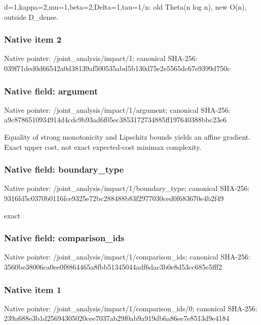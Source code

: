 \documentclass[10pt,a4paper]{article}
\begin{document}
\begingroup\raggedright\sloppy d=\allowbreak{}1,\allowbreak{}kappa=\allowbreak{}2,\allowbreak{}mu=\allowbreak{}1,\allowbreak{}beta=\allowbreak{}2,\allowbreak{}Delta=\allowbreak{}1,\allowbreak{}tau=\allowbreak{}1/\allowbreak{}n:\allowbreak{} old Theta(n log n),\allowbreak{} new O(n),\allowbreak{} outside D\_\allowbreak{}dense.\par\endgroup

\subsubsection{Native item 2}
Native pointer: /joint\_\allowbreak{}analysis/impact/1; canonical SHA-256: 039f71ded0d66542a0d38139af500535abd5b130d75e2e5565dc67e9399d750c

\subsubsection{Native field: argument}
Native pointer: /joint\_\allowbreak{}analysis/impact/1/argument; canonical SHA-256: a9c8786510934914d4cdc9b93ad6f05ec3853172734885ff197640388bbc23e6

\begingroup\raggedright\sloppy Equality of strong monotonicity and Lipschitz bounds yields an affine gradient. Exact upper cost,\allowbreak{} not exact expected-cost minimax complexity.\par\endgroup

\subsubsection{Native field: boundary\_\allowbreak{}type}
Native pointer: /joint\_\allowbreak{}analysis/impact/1/boundary\_\allowbreak{}type; canonical SHA-256: 9316fd5c0370b0116fce9325e72bc288488b83f2977030ced0f683670e4b2f49

\begingroup\raggedright\sloppy exact\par\endgroup

\subsubsection{Native field: comparison\_\allowbreak{}ids}
Native pointer: /joint\_\allowbreak{}analysis/impact/1/comparison\_\allowbreak{}ids; canonical SHA-256: 3560be38006ca0ee0f8864465a8fbb51345044adf6dac3b0e8d53cc685e5fff2

\subsubsection{Native item 1}
Native pointer: /joint\_\allowbreak{}analysis/impact/1/comparison\_\allowbreak{}ids/0; canonical SHA-256: 239a688e3b1d25694305020cee7037ab29f0ab9a919db6a86ee7e8513d9e4184
\end{document}
